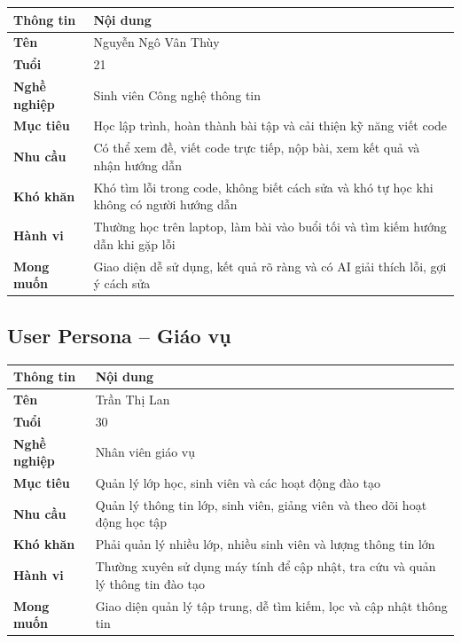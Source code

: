 \documentclass[12pt,a4paper,oneside]{report}
\begin{document}
\begin{center}
\vspace{4pt}
\begin{tabular}{|>{\bfseries}p{3.2cm}|p{11.5cm}|}
\hline
Thông tin & Nội dung \\
\hline
Tên & Nguyễn Ngô Vân Thùy \\
\hline
Tuổi & 21 \\
\hline
Nghề nghiệp & Sinh viên Công nghệ thông tin \\
\hline
Mục tiêu & Học lập trình, hoàn thành bài tập và cải thiện kỹ năng viết code \\
\hline
Nhu cầu & Có thể xem đề, viết code trực tiếp, nộp bài, xem kết quả và nhận hướng dẫn \\
\hline
Khó khăn & Khó tìm lỗi trong code, không biết cách sửa và khó tự học khi không có người hướng dẫn \\
\hline
Hành vi & Thường học trên laptop, làm bài vào buổi tối và tìm kiếm hướng dẫn khi gặp lỗi \\
\hline
Mong muốn & Giao diện dễ sử dụng, kết quả rõ ràng và có AI giải thích lỗi, gợi ý cách sửa \\
\hline
\end{tabular}
\end{center}

\newpage

\subsection{User Persona -- Giáo vụ}


\begin{center}
\vspace{4pt}
\begin{tabular}{|>{\bfseries}p{3.2cm}|p{11.5cm}|}
\hline
Thông tin & Nội dung \\
\hline
Tên & Trần Thị Lan \\
\hline
Tuổi & 30 \\
\hline
Nghề nghiệp & Nhân viên giáo vụ \\
\hline
Mục tiêu & Quản lý lớp học, sinh viên và các hoạt động đào tạo \\
\hline
Nhu cầu & Quản lý thông tin lớp, sinh viên, giảng viên và theo dõi hoạt động học tập \\
\hline
Khó khăn & Phải quản lý nhiều lớp, nhiều sinh viên và lượng thông tin lớn \\
\hline
Hành vi & Thường xuyên sử dụng máy tính để cập nhật, tra cứu và quản lý thông tin đào tạo \\
\hline
Mong muốn & Giao diện quản lý tập trung, dễ tìm kiếm, lọc và cập nhật thông tin \\
\hline
\end{tabular}
\end{center}
\end{document}

